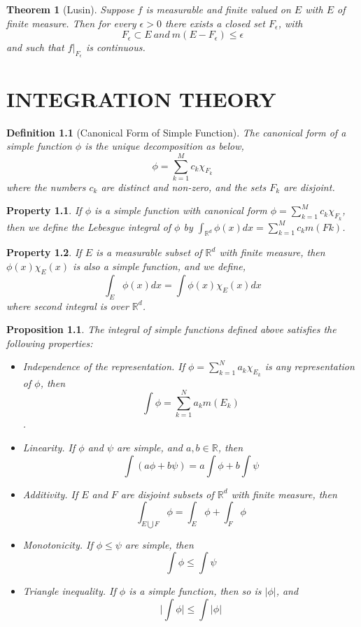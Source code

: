 \documentclass{report}
\theoremstyle{upthm}
\newtheorem{thm}{Theorem}
\newtheorem{defn}{Definition}
\newtheorem{prop}{Proposition}
\newtheorem{property}{Property}
\newcommand{\reals}{\mathbb{R}}
\newcommand{\union}{\bigcup}
\newcommand{\vl}{\Big|}
\begin{document}
\begin{thm}[Lusin]
	Suppose $f$ is measurable and finite valued on $E$ with $E$ of finite measure. Then for every $\epsilon > 0$ there exists a closed set $F_\epsilon$, with
	$$F_\epsilon \subset E\ and\ m(E - F_\epsilon) \leq \epsilon$$
	and such that $f|_{F_\epsilon}$ is continuous.
\end{thm}

\chapter{INTEGRATION THEORY}
\begin{defn}[Canonical Form of Simple Function]
	The canonical form of a simple function $\phi$ is the unique decomposition as below,
	$$  \phi = \sum_{k=1}^{M} c_k \chi_{F_k}  $$
	 where the numbers $c_k$ are distinct and non-zero, and the sets $F_k$ are disjoint.
\end{defn}
\begin{property}
	If $\phi$ is a simple function with canonical form $  \phi = \sum_{k=1}^{M} c_k \chi_{F_k}  $, then we define the Lebesgue integral of $\phi$ by $\int_{\reals^d}^{} \phi(x) dx = \sum_{k=1}^{M} c_k m(Fk)$.
\end{property}
\begin{property}
	If $E$ is a measurable subset of $\reals^d$ with finite measure, then $ \phi(x) \chi_E(x)$
	is also a simple function, and we define,
	$$ \int_{E} \phi(x) dx = \int \phi(x) \chi_E(x) dx $$
	where second integral is over $\reals^d$.
\end{property}

\begin{prop}
	The integral of simple functions defined above satisfies the following properties:
	\begin{itemize}
		\item Independence of the representation. If $ \phi = \sum_{k=1}^{N} a_k \chi_{E_k}$ is any representation of $\phi$, then
		$$ \int \phi = \sum_{k=1}^{N} a_k m(E_k) $$.
		\item Linearity. If $\phi$ and $\psi$ are simple, and $a, b \in \reals$, then
		$$\int (a \phi + b \psi) = a \int \phi + b \int \psi $$
		\item Additivity. If $E$ and $F$ are disjoint subsets of $\reals^d$ with finite measure, then
		$$ \int_{E \union F} \phi = \int_{E} \phi + \int_{F} \phi $$
		\item Monotonicity. If $\phi  \leq \psi$ are simple, then
		$$ \int \phi \leq \int \psi$$
		\item Triangle inequality. If $\phi$ is a simple function, then so is $|\phi|$, and
		$$ \vl \int \phi \vl \leq \int \vl \phi \vl  $$
	\end{itemize}
\end{prop}
\end{document}
